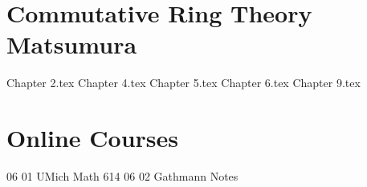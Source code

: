 \documentclass{article}
\begin{document}
\newpage\part{Commutative Ring Theory Matsumura}
{Chapter 2.tex}
{Chapter 4.tex}
{Chapter 5.tex}
{Chapter 6.tex}
{Chapter 9.tex}


\newpage\part{Online Courses}
{06 01 UMich Math 614}
{06 02 Gathmann Notes}

\newpage

\end{document}
